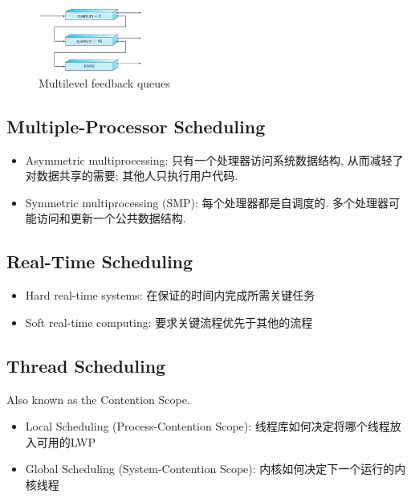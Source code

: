 \begin{figure}[!htb]
    \centering
    \includegraphics[width=0.309\textwidth]{pic/OS5/Multilevel feedback queues}
    \caption{Multilevel feedback queues}
\end{figure}

\subsection{Multiple-Processor Scheduling}
\begin{itemize}\small
    \item Asymmetric multiprocessing: 只有一个处理器访问系统数据结构, 从而减轻了对数据共享的需要; 其他人只执行用户代码.
    \item Symmetric multiprocessing (SMP): 每个处理器都是自调度的. 多个处理器可能访问和更新一个公共数据结构. 
\end{itemize}

\subsection{Real-Time Scheduling}
\begin{itemize}\small
    \item Hard real-time systems: 在保证的时间内完成所需关键任务
    \item Soft real-time computing: 要求关键流程优先于其他的流程
\end{itemize}

\subsection{Thread Scheduling}
Also known as the Contention Scope. 
\begin{itemize}\small
    \item Local Scheduling (Process-Contention Scope): 线程库如何决定将哪个线程放入可用的LWP
    \item Global Scheduling (System-Contention Scope): 内核如何决定下一个运行的内核线程
\end{itemize}

